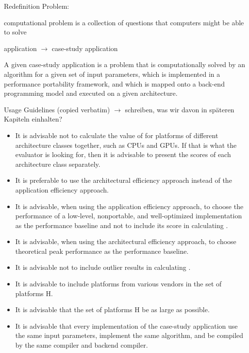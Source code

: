 Redefinition Problem: 
\begin{quotebox}
    computational problem is a collection of questions that computers might be able to solve
\end{quotebox}

application $\rightarrow$ case-study application
\begin{quotebox}
    A given case-study application is a problem that is computationally solved by an algorithm for a given set of input parameters, which is implemented in a performance portability framework, and which is mapped onto a back-end programming model and executed on a given architecture.
\end{quotebox}

Usage Guidelines (copied verbatim) $\rightarrow$ schreiben, was wir davon in späteren Kapiteln einhalten?
\begin{itemize}
    \item It is advisable not to calculate the value of \mpp for platforms of different architecture classes together, such as CPUs and GPUs. If that is what the evaluator is looking for, then it is advisable to present the scores of each architecture class separately.
    \item It is preferable to use the architectural efficiency approach instead of the application efficiency approach.
    \item It is advisable, when using the application efficiency approach, to choose the performance of a low-level, nonportable, and well-optimized implementation as the performance baseline and not to include its score in calculating \mpp.
    \item It is advisable, when using the architectural efficiency approach, to choose theoretical peak performance as the performance baseline.
    \item It is advisable not to include outlier results in calculating \mpp.
    \item It is advisable to include platforms from various vendors in the set of platforms H.
    \item It is advisable that the set of platforms H be as large as possible.
    \item It is advisable that every implementation of the case-study application use the same input parameters, implement the same algorithm, and be compiled by the same compiler and backend compiler.
\end{itemize}



